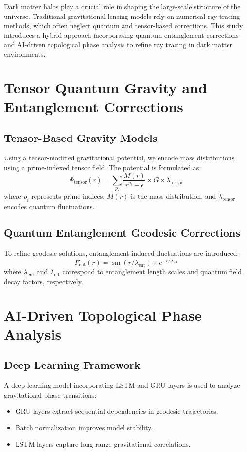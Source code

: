 \documentclass{article}
\theoremstyle{plain}
\begin{document}
Dark matter halos play a crucial role in shaping the large-scale structure of the universe. Traditional gravitational lensing models rely on numerical ray-tracing methods, which often neglect quantum and tensor-based corrections. This study introduces a hybrid approach incorporating quantum entanglement corrections and AI-driven topological phase analysis to refine ray tracing in dark matter environments.

\section{Tensor Quantum Gravity and Entanglement Corrections}
\subsection{Tensor-Based Gravity Models}
Using a tensor-modified gravitational potential, we encode mass distributions using a prime-indexed tensor field. The potential is formulated as:
\begin{equation}
\Phi_{\text{tensor}}(r) = \sum_{p_i} \frac{M(r)}{r^{p_i} + \epsilon} \times G \times \lambda_{\text{tensor}}
\end{equation}
where $p_i$ represents prime indices, $M(r)$ is the mass distribution, and $\lambda_{\text{tensor}}$ encodes quantum fluctuations.

\subsection{Quantum Entanglement Geodesic Corrections}
To refine geodesic solutions, entanglement-induced fluctuations are introduced:
\begin{equation}
F_{\text{ent}}(r) = \sin(r / \lambda_{\text{ent}}) \times e^{-r / \lambda_{\text{qft}}}
\end{equation}
where $\lambda_{\text{ent}}$ and $\lambda_{\text{qft}}$ correspond to entanglement length scales and quantum field decay factors, respectively.

\section{AI-Driven Topological Phase Analysis}
\subsection{Deep Learning Framework}
A deep learning model incorporating LSTM and GRU layers is used to analyze gravitational phase transitions:
\begin{itemize}
\item GRU layers extract sequential dependencies in geodesic trajectories.
\item Batch normalization improves model stability.
\item LSTM layers capture long-range gravitational correlations.
\end{itemize}
\end{document}
